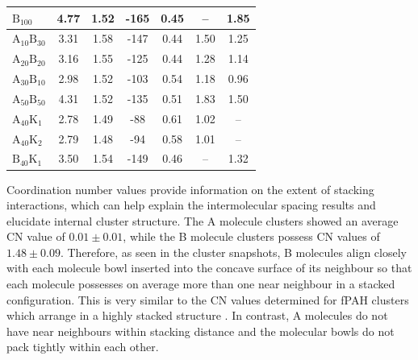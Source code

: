 \begin{table}[ht]
\begin{tabular}{lcccccc}
$\text{B}_{\text{100}}$ & 4.77 & 1.52 & -165 & 0.45 &  \multicolumn{1}{c}{--} & 1.85 \\ \hline
$\text{A}_{\text{10}}\text{B}_{\text{30}}$ & 3.31 & 1.58 & -147 & 0.44 &  \multicolumn{1}{c}{1.50} & 1.25 \\ $\text{A}_{\text{20}}\text{B}_{\text{20}}$ & 3.16 & 1.55 & -125 & 0.44 &  \multicolumn{1}{c}{1.28} & 1.14 \\
$\text{A}_{\text{30}}\text{B}_{\text{10}}$ & 2.98 & 1.52 & -103 & 0.54 &  \multicolumn{1}{c}{1.18} & 0.96 \\
$\text{A}_{\text{50}}\text{B}_{\text{50}}$ & 4.31 & 1.52 & -135 & 0.51 &  \multicolumn{1}{c}{1.83} & 1.50 \\ \hline
$\text{A}_{\text{40}}\text{K}_{\text{1}}$ & 2.78 & 1.49 & -88 & 0.61 &  \multicolumn{1}{c}{1.02} & -- \\
$\text{A}_{\text{40}}\text{K}_{\text{2}}$ & 2.79 & 1.48 & -94 & 0.58 &  \multicolumn{1}{c}{1.01} & -- \\ 
$\text{B}_{\text{40}}\text{K}_{\text{1}}$ & 3.50 & 1.54 & -149 & 0.46 &  \multicolumn{1}{c}{--} & 1.32 \\
\end{tabular}
\end{table}
%

Coordination number values provide information on the extent of stacking interactions, which can help explain the intermolecular spacing results and elucidate internal cluster structure. The A molecule clusters showed an average CN value of $0.01 \pm 0.01$, while the B molecule clusters possess CN values of $1.48 \pm 0.09$. Therefore, as seen in the cluster snapshots, B molecules align closely with each molecule bowl inserted into the concave surface of its neighbour so that each molecule possesses on average more than one near neighbour in a stacked configuration. This is very similar to the CN values determined for fPAH clusters which arrange in a highly stacked structure \cite{bowal2018partitioning}. In contrast, A molecules do not have near neighbours within stacking distance and the molecular bowls do not pack tightly within each other. 
%

